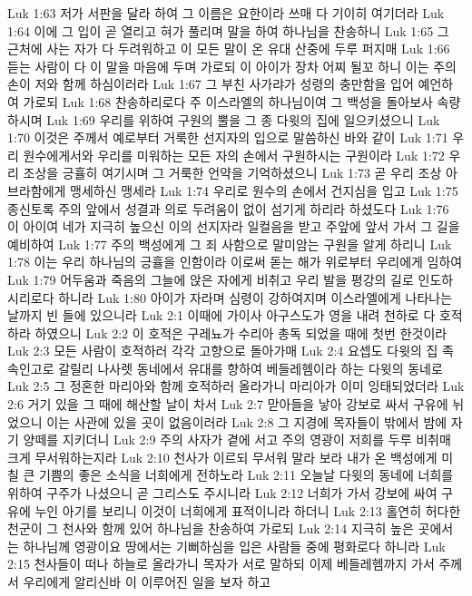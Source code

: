 Luk 1:63  저가 서판을 달라 하여 그 이름은 요한이라 쓰매 다 기이히 여기더라
Luk 1:64  이에 그 입이 곧 열리고 혀가 풀리며 말을 하여 하나님을 찬송하니
Luk 1:65  그 근처에 사는 자가 다 두려워하고 이 모든 말이 온 유대 산중에 두루 퍼지매
Luk 1:66  듣는 사람이 다 이 말을 마음에 두며 가로되 이 아이가 장차 어찌 될꼬 하니 이는 주의 손이 저와 함께 하심이러라
Luk 1:67  그 부친 사가랴가 성령의 충만함을 입어 예언하여 가로되
Luk 1:68  찬송하리로다 주 이스라엘의 하나님이여 그 백성을 돌아보사 속량하시며
Luk 1:69  우리를 위하여 구원의 뿔을 그 종 다윗의 집에 일으키셨으니
Luk 1:70  이것은 주께서 예로부터 거룩한 선지자의 입으로 말씀하신 바와 같이
Luk 1:71  우리 원수에게서와 우리를 미워하는 모든 자의 손에서 구원하시는 구원이라
Luk 1:72  우리 조상을 긍휼히 여기시며 그 거룩한 언약을 기억하셨으니
Luk 1:73  곧 우리 조상 아브라함에게 맹세하신 맹세라
Luk 1:74  우리로 원수의 손에서 건지심을 입고
Luk 1:75  종신토록 주의 앞에서 성결과 의로 두려움이 없이 섬기게 하리라 하셨도다
Luk 1:76  이 아이여 네가 지극히 높으신 이의 선지자라 일컬음을 받고 주앞에 앞서 가서 그 길을 예비하여
Luk 1:77  주의 백성에게 그 죄 사함으로 말미암는 구원을 알게 하리니
Luk 1:78  이는 우리 하나님의 긍휼을 인함이라 이로써 돋는 해가 위로부터 우리에게 임하여
Luk 1:79  어두움과 죽음의 그늘에 앉은 자에게 비취고 우리 발을 평강의 길로 인도하시리로다 하니라
Luk 1:80  아이가 자라며 심령이 강하여지며 이스라엘에게 나타나는 날까지 빈 들에 있으니라
Luk 2:1  이때에 가이사 아구스도가 영을 내려 천하로 다 호적하라 하였으니
Luk 2:2  이 호적은 구레뇨가 수리아 총독 되었을 때에 첫번 한것이라
Luk 2:3  모든 사람이 호적하러 각각 고향으로 돌아가매
Luk 2:4  요셉도 다윗의 집 족속인고로 갈릴리 나사렛 동네에서 유대를 향하여 베들레헴이라 하는 다윗의 동네로
Luk 2:5  그 정혼한 마리아와 함께 호적하러 올라가니 마리아가 이미 잉태되었더라
Luk 2:6  거기 있을 그 때에 해산할 날이 차서
Luk 2:7  맏아들을 낳아 강보로 싸서 구유에 뉘었으니 이는 사관에 있을 곳이 없음이러라
Luk 2:8  그 지경에 목자들이 밖에서 밤에 자기 양떼를 지키더니
Luk 2:9  주의 사자가 곁에 서고 주의 영광이 저희를 두루 비취매 크게 무서워하는지라
Luk 2:10  천사가 이르되 무서워 말라 보라 내가 온 백성에게 미칠 큰 기쁨의 좋은 소식을 너희에게 전하노라
Luk 2:11  오늘날 다윗의 동네에 너희를 위하여 구주가 나셨으니 곧 그리스도 주시니라
Luk 2:12  너희가 가서 강보에 싸여 구유에 누인 아기를 보리니 이것이 너희에게 표적이니라 하더니
Luk 2:13  홀연히 허다한 천군이 그 천사와 함께 있어 하나님을 찬송하여 가로되
Luk 2:14  지극히 높은 곳에서는 하나님께 영광이요 땅에서는 기뻐하심을 입은 사람들 중에 평화로다 하니라
Luk 2:15  천사들이 떠나 하늘로 올라가니 목자가 서로 말하되 이제 베들레헴까지 가서 주께서 우리에게 알리신바 이 이루어진 일을 보자 하고
